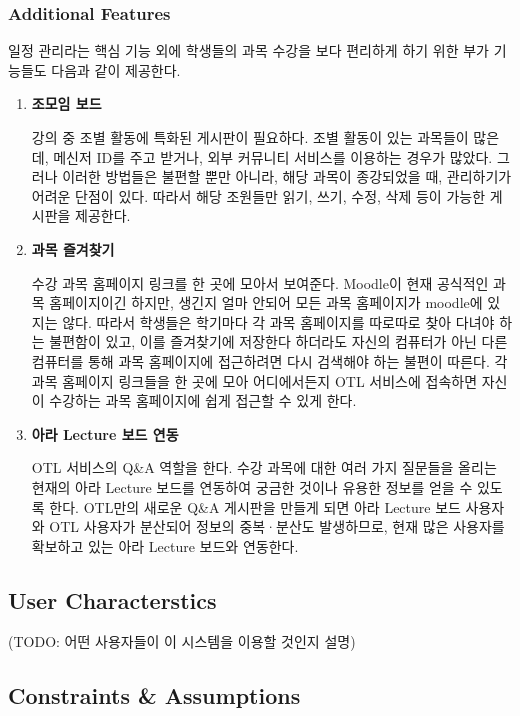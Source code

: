 \documentclass[a4paper,titlepage]{article}
\begin{document}
\subsubsection{Additional Features}
일정 관리라는 핵심 기능 외에 학생들의 과목 수강을 보다 편리하게 하기 위한 부가 기능들도 다음과 같이 제공한다.
\begin{enumerate}
	\item\textbf{조모임 보드}

	강의 중 조별 활동에 특화된 게시판이 필요하다.
	조별 활동이 있는 과목들이 많은데, 메신저 ID를 주고 받거나, 외부 커뮤니티 서비스를 이용하는 경우가 많았다.
	그러나 이러한 방법들은 불편할 뿐만 아니라, 해당 과목이 종강되었을 때, 관리하기가 어려운 단점이 있다. 
	따라서 해당 조원들만 읽기, 쓰기, 수정, 삭제 등이 가능한 게시판을 제공한다. 

	\item\textbf{과목 즐겨찾기}

	수강 과목 홈페이지 링크를 한 곳에 모아서 보여준다.
	Moodle이 현재 공식적인 과목 홈페이지이긴 하지만, 생긴지 얼마 안되어 모든 과목 홈페이지가 moodle에 있지는 않다.
	따라서 학생들은 학기마다 각 과목 홈페이지를 따로따로 찾아 다녀야 하는 불편함이 있고, 이를 즐겨찾기에 저장한다 하더라도 자신의 컴퓨터가 아닌 다른 컴퓨터를 통해 과목 홈페이지에 접근하려면 다시 검색해야 하는 불편이 따른다.
	각 과목 홈페이지 링크들을 한 곳에 모아 어디에서든지 OTL 서비스에 접속하면 자신이 수강하는 과목 홈페이지에 쉽게 접근할 수 있게 한다. 

	\item\textbf{아라 Lecture 보드 연동}

	OTL 서비스의 Q\&A 역할을 한다.
	수강 과목에 대한 여러 가지 질문들을 올리는 현재의 아라 Lecture 보드를 연동하여 궁금한 것이나 유용한 정보를 얻을 수 있도록 한다.
	OTL만의 새로운 Q\&A 게시판을 만들게 되면 아라 Lecture 보드 사용자와 OTL 사용자가 분산되어 정보의 중복·분산도 발생하므로, 현재 많은 사용자를 확보하고 있는 아라 Lecture 보드와 연동한다.

\end{enumerate}

\subsection{User Characterstics}

(TODO: 어떤 사용자들이 이 시스템을 이용할 것인지 설명)

\subsection{Constraints \& Assumptions}
\end{document}
